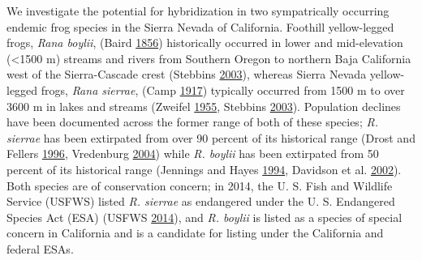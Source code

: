 \documentclass[proquest,12pt,final]{ucthesis-CA2012} %
\begin{document}
\begin{ucmainmatter}
We investigate the potential for hybridization in two sympatrically
occurring endemic frog species in the Sierra Nevada of California.
Foothill yellow-legged frogs, \emph{Rana boylii}, (Baird
\protect\hyperlink{ref-baird_descriptions_1856}{1856}) historically
occurred in lower and mid-elevation (\textless{}1500 m) streams and
rivers from Southern Oregon to northern Baja California west of the
Sierra-Cascade crest (Stebbins
\protect\hyperlink{ref-stebbins_field_2003}{2003}), whereas Sierra
Nevada yellow-legged frogs, \emph{Rana sierrae}, (Camp
\protect\hyperlink{ref-camp_notes_1917}{1917}) typically occurred from
1500 m to over 3600 m in lakes and streams (Zweifel
\protect\hyperlink{ref-zweifel_ecology_1955}{1955}, Stebbins
\protect\hyperlink{ref-stebbins_field_2003}{2003}). Population declines
have been documented across the former range of both of these species;
\emph{R. sierrae} has been extirpated from over 90 percent of its
historical range (Drost and Fellers
\protect\hyperlink{ref-drost_collapse_1996}{1996}, Vredenburg
\protect\hyperlink{ref-vredenburg_reversing_2004}{2004}) while \emph{R.
boylii} has been extirpated from 50 percent of its historical range
(Jennings and Hayes
\protect\hyperlink{ref-jennings_amphibian_1994}{1994}, Davidson et al.
\protect\hyperlink{ref-davidson_spatial_2002}{2002}). Both species are
of conservation concern; in 2014, the U. S. Fish and Wildlife Service
(USFWS) listed \emph{R. sierrae} as endangered under the U. S.
Endangered Species Act (ESA) (USFWS
\protect\hyperlink{ref-usfws_endangered_2014}{2014}), and \emph{R.
boylii} is listed as a species of special concern in California and is a
candidate for listing under the California and federal ESAs.


\end{ucmainmatter}
\end{document}
